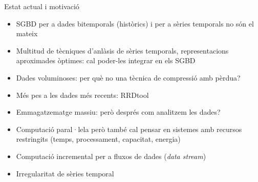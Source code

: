




\begin{frame}{Estat actual i motivació}
  \begin{itemize}
  \item  SGBD per a dades bitemporals (històrics) i per a sèries temporals no són el mateix
  \item Multitud de tècniques d’anlàsis de sèries temporals, representacions aproximades òptimes: cal poder-les integrar en els SGBD %
  \item Dades voluminoses: per què no una tècnica de compressió amb pèrdua?
  \item Més pes a les dades més recents:  RRDtool%
  \item Emmagatzematge massiu:  però després com analitzem les dades?
  \item Computació paral·lela però també cal pensar en sistemes amb recursos restringits (temps, processament, capacitat, energia)
  \item Computació incremental per a fluxos de dades (\emph{data stream})
  \item Irregularitat de sèries temporal
  \end{itemize}

\end{frame}


